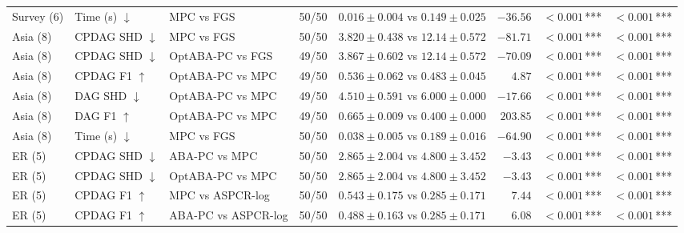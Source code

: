 \begin{table}[t]
{\begin{tabular}{lllrcrcc}
Survey (6) & Time (s) $\downarrow$ & MPC vs FGS & 50/50 & $0.016\pm0.004$ vs $0.149\pm0.025$ & $-36.56$ & $<0.001$\,*** & $<0.001$\,***\\
Asia (8) & CPDAG SHD $\downarrow$ & MPC vs FGS & 50/50 & $3.820\pm0.438$ vs $12.14\pm0.572$ & $-81.71$ & $<0.001$\,*** & $<0.001$\,***\\
Asia (8) & CPDAG SHD $\downarrow$ & OptABA-PC vs FGS & 49/50 & $3.867\pm0.602$ vs $12.14\pm0.572$ & $-70.09$ & $<0.001$\,*** & $<0.001$\,***\\
Asia (8) & CPDAG F1 $\uparrow$ & OptABA-PC vs MPC & 49/50 & $0.536\pm0.062$ vs $0.483\pm0.045$ & $4.87$ & $<0.001$\,*** & $<0.001$\,***\\
Asia (8) & DAG SHD $\downarrow$ & OptABA-PC vs MPC & 49/50 & $4.510\pm0.591$ vs $6.000\pm0.000$ & $-17.66$ & $<0.001$\,*** & $<0.001$\,***\\
Asia (8) & DAG F1 $\uparrow$ & OptABA-PC vs MPC & 49/50 & $0.665\pm0.009$ vs $0.400\pm0.000$ & $203.85$ & $<0.001$\,*** & $<0.001$\,***\\
Asia (8) & Time (s) $\downarrow$ & MPC vs FGS & 50/50 & $0.038\pm0.005$ vs $0.189\pm0.016$ & $-64.90$ & $<0.001$\,*** & $<0.001$\,***\\
ER (5) & CPDAG SHD $\downarrow$ & ABA-PC vs MPC & 50/50 & $2.865\pm2.004$ vs $4.800\pm3.452$ & $-3.43$ & $<0.001$\,*** & $<0.001$\,***\\
ER (5) & CPDAG SHD $\downarrow$ & OptABA-PC vs MPC & 50/50 & $2.865\pm2.004$ vs $4.800\pm3.452$ & $-3.43$ & $<0.001$\,*** & $<0.001$\,***\\
ER (5) & CPDAG F1 $\uparrow$ & MPC vs ASPCR-log & 50/50 & $0.543\pm0.175$ vs $0.285\pm0.171$ & $7.44$ & $<0.001$\,*** & $<0.001$\,***\\
ER (5) & CPDAG F1 $\uparrow$ & ABA-PC vs ASPCR-log & 50/50 & $0.488\pm0.163$ vs $0.285\pm0.171$ & $6.08$ & $<0.001$\,*** & $<0.001$\,***\\
\bottomrule
\end{tabular}%
}
\end{table}

